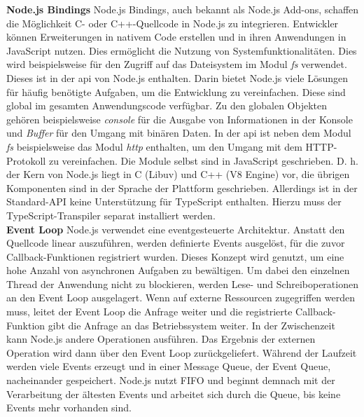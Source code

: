 \noindent
\textbf{Node.js Bindings} \newline
Node.js Bindings, auch bekannt als Node.js Add-ons, schaffen die Möglichkeit C- oder C++-Quellcode in Node.js zu integrieren. Entwickler können Erweiterungen in nativem Code erstellen und in ihren Anwendungen in JavaScript nutzen. Dies ermöglicht die Nutzung von Systemfunktionalitäten. Dies wird beispielsweise für den Zugriff auf das Dateisystem im Modul \textit{fs} verwendet. Dieses ist in der \ac{api} von Node.js enthalten. Darin bietet Node.js viele Lösungen für häufig benötigte Aufgaben, um die Entwicklung zu vereinfachen. Diese sind global im gesamten Anwendungscode verfügbar. Zu den globalen Objekten gehören beispielsweise \textit{console} für die Ausgabe von Informationen in der Konsole und \textit{Buffer} für den Umgang mit binären Daten. In der \ac{api} ist neben dem Modul \textit{fs} beispielsweise das Modul \textit{http} enthalten, um den Umgang mit dem HTTP-Protokoll zu vereinfachen. Die Module selbst sind in JavaScript geschrieben. D. h. der Kern von Node.js liegt in C (Libuv) und C++ (V8 Engine)  vor, die übrigen Komponenten sind in der Sprache der Plattform geschrieben. Allerdings ist in der Standard-API keine Unterstützung für TypeScript enthalten. Hierzu muss der TypeScript-Transpiler separat installiert werden.\cite{Springer.2022, OpenJSFoundation.2022b, OpenJSFoundation.o.J.b}\\

\noindent
\textbf{Event Loop} \newline
Node.js verwendet eine eventgesteuerte Architektur. Anstatt den Quellcode linear auszuführen, werden definierte Events ausgelöst, für die zuvor Callback-Funktionen registriert wurden. Dieses Konzept wird genutzt, um eine hohe Anzahl von asynchronen Aufgaben zu bewältigen. Um dabei den einzelnen Thread der Anwendung nicht zu blockieren, werden Lese- und Schreiboperationen an den Event Loop ausgelagert.  Wenn auf externe Ressourcen zugegriffen werden muss, leitet der Event Loop die Anfrage weiter und die registrierte Callback-Funktion gibt die Anfrage an das Betriebssystem weiter. In der Zwischenzeit kann Node.js andere Operationen ausführen. Das Ergebnis der externen Operation wird dann über den Event Loop zurückgeliefert.\cite{Springer.2022} \newline 
Während der Laufzeit werden viele Events erzeugt und in einer Message Queue, der Event Queue, nacheinander gespeichert. Node.js nutzt FIFO und beginnt demnach mit der Verarbeitung der ältesten Events und arbeitet sich durch die Queue, bis keine Events mehr vorhanden sind.\cite{OpenJSFoundation.o.J.c}\\

